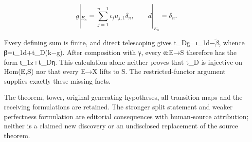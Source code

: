 \[
 g|_{E_n}=\sum_{j=1}^{n-1}\iota_ju_{j,1}\delta_n,\qquad
 d|_{E_n}=\delta_n.
\]

Every defining sum is finite,\allowbreak{} and direct telescoping gives t\_\allowbreak{}Dg\allowbreak{}=ι\_\allowbreak{}1d−\(\widetilde\beta\),\allowbreak{} whence β\allowbreak{}=ι\_\allowbreak{}1d\allowbreak{}+t\_\allowbreak{}D(k−g)\allowbreak{}. After composition with γ,\allowbreak{} every α:\allowbreak{}E\allowbreak{}→S therefore has the form ι\_\allowbreak{}1z\allowbreak{}+t\_\allowbreak{}Dη. This calculation alone neither proves that t\_\allowbreak{}D is injective on Hom(E,\allowbreak{}S)\allowbreak{} nor that every E\allowbreak{}→X lifts to S. The restricted-functor argument supplies exactly these missing facts.

The theorem,\allowbreak{} tower,\allowbreak{} original generating hypotheses,\allowbreak{} all transition maps and the receiving formulations are retained. The stronger split statement and weaker perfectness formulation are editorial consequences with human-source attribution; neither is a claimed new discovery or an undisclosed replacement of the source theorem.
